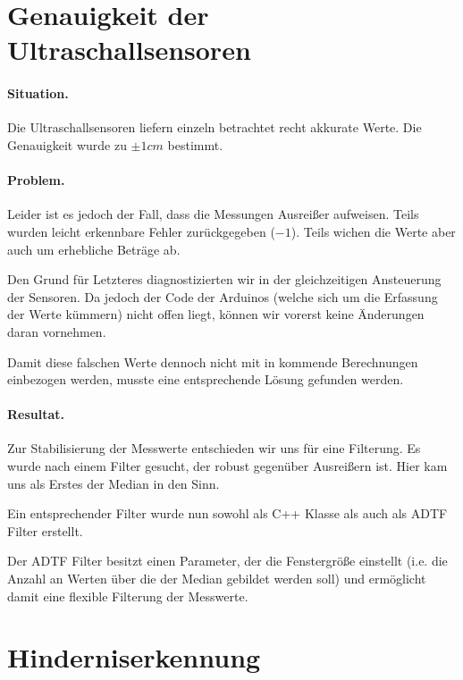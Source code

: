 \documentclass[a4paper,12pt]{report}
\begin{document}
\section{Genauigkeit der Ultraschallsensoren}

	\paragraph{Situation.}
	Die Ultraschallsensoren liefern einzeln betrachtet recht akkurate Werte.
	Die Genauigkeit wurde zu $\pm1cm$ bestimmt.
	
	\paragraph{Problem.}
	Leider ist es jedoch der Fall, dass die Messungen Ausreißer aufweisen.
	Teils wurden leicht erkennbare Fehler zurückgegeben ($-1$). Teils wichen die Werte aber auch um erhebliche Beträge ab.
	
	Den Grund für Letzteres diagnostizierten wir in der gleichzeitigen Ansteuerung der Sensoren.
	Da jedoch der Code der Arduinos (welche sich um die Erfassung der Werte kümmern) nicht offen liegt, können wir vorerst keine Änderungen daran vornehmen.
	
	Damit diese falschen Werte dennoch nicht mit in kommende Berechnungen einbezogen werden, musste eine entsprechende Lösung gefunden werden.

	\paragraph{Resultat.} %
	Zur Stabilisierung der Messwerte entschieden wir uns für eine Filterung.
	Es wurde nach einem Filter gesucht, der robust gegenüber Ausreißern ist.
	Hier kam uns als Erstes der Median in den Sinn.
	
	Ein entsprechender Filter wurde nun sowohl als C++ Klasse als auch als ADTF Filter erstellt.

	Der ADTF Filter besitzt einen Parameter, der die Fenstergröße einstellt (i.e. die Anzahl an Werten über die der Median gebildet werden soll) und ermöglicht damit eine flexible Filterung der Messwerte.

\section{Hinderniserkennung}
	
\end{document}
